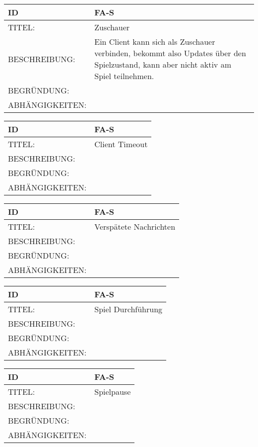 \begin{tabularx}{16cm}{l|X}
\textbf{ID} & \textbf{FA-S} \\
\hline
TITEL: & Zuschauer \\
\hline
BESCHREIBUNG: & Ein Client kann sich als Zuschauer verbinden, bekommt also Updates über den Spielzustand, kann aber nicht aktiv am Spiel teilnehmen. \\
\hline
BEGRÜNDUNG: & \\
\hline
ABHÄNGIGKEITEN: & \\
\end{tabularx}

\begin{tabularx}{16cm}{l|X}
\textbf{ID} & \textbf{FA-S} \\
\hline
TITEL: & Client Timeout \\
\hline
BESCHREIBUNG: & \\
\hline
BEGRÜNDUNG: & \\
\hline
ABHÄNGIGKEITEN: & \\
\end{tabularx}

\begin{tabularx}{16cm}{l|X}
\textbf{ID} & \textbf{FA-S} \\
\hline
TITEL: & Verspätete Nachrichten \\
\hline
BESCHREIBUNG: & \\
\hline
BEGRÜNDUNG: & \\
\hline
ABHÄNGIGKEITEN: & \\
\end{tabularx}

\begin{tabularx}{16cm}{l|X}
\textbf{ID} & \textbf{FA-S} \\
\hline
TITEL: & Spiel Durchführung \\
\hline
BESCHREIBUNG: & \\
\hline
BEGRÜNDUNG: & \\
\hline
ABHÄNGIGKEITEN: & \\
\end{tabularx}

\begin{tabularx}{16cm}{l|X}
\textbf{ID} & \textbf{FA-S} \\
\hline
TITEL: & Spielpause \\
\hline
BESCHREIBUNG: & \\
\hline
BEGRÜNDUNG: & \\
\hline
ABHÄNGIGKEITEN: & \\
\end{tabularx}

